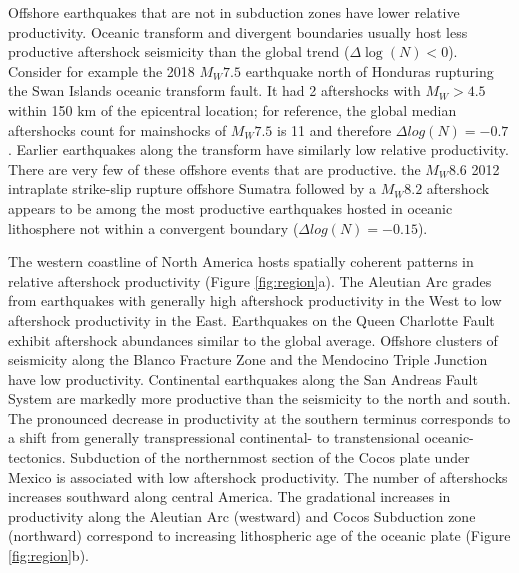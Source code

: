 \documentclass[draft, jgrga]{agujournal2018}
\begin{document}
    Offshore earthquakes that are not in subduction zones have lower relative productivity. Oceanic transform and divergent boundaries usually host less productive aftershock seismicity than the global trend ($\Delta \log(N)<0$). Consider for example the 2018 $M_W7.5$ earthquake north of Honduras rupturing the Swan Islands oceanic transform fault. It had 2 aftershocks with $M_W>4.5$ within 150 km of the epicentral location; for reference, the global median aftershocks count for mainshocks of $M_W7.5$ is 11 and therefore $\Delta log(N) = -0.7$. Earlier earthquakes along the transform have similarly low relative productivity. There are very few of these offshore events that are productive.  the $M_W8.6$ 2012 intraplate strike-slip rupture offshore Sumatra followed by a $M_W8.2$ aftershock appears to be among the most productive earthquakes hosted in oceanic lithosphere not within a convergent boundary ($\Delta log(N) = -0.15$).
    
    The western coastline of North America hosts spatially coherent patterns in relative aftershock productivity (Figure \ref{fig:region}a). The Aleutian Arc grades from earthquakes with generally high aftershock productivity in the West to low aftershock productivity in the East. Earthquakes on the Queen Charlotte Fault exhibit aftershock abundances similar to the global average. Offshore clusters of seismicity along the Blanco Fracture Zone and the Mendocino Triple Junction have low productivity. Continental earthquakes along the San Andreas Fault System are markedly more productive than the seismicity to the north and south. The pronounced decrease in productivity at the southern terminus corresponds to a shift from generally transpressional continental- to transtensional oceanic-tectonics. Subduction of the northernmost section of the Cocos plate under Mexico is associated with low aftershock productivity. The number of aftershocks increases southward along central America. The gradational increases in productivity along the Aleutian Arc (westward) and Cocos Subduction zone (northward) correspond to increasing lithospheric age of the oceanic plate (Figure \ref{fig:region}b).
\end{document}
